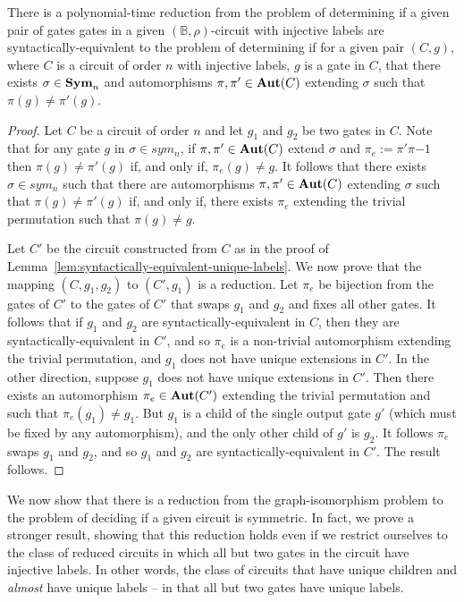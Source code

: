 \documentclass[../paper.tex]{subfiles}
\begin{document}
\begin{lem}
  There is a polynomial-time reduction from the problem of determining if a
  given pair of gates gates in a given $(\mathbb{B}, \rho)$-circuit with
  injective labels are syntactically-equivalent to the problem of determining if
  for a given pair $(C, g)$, where $C$ is a circuit of order $n$ with injective
  labels, $g$ is a gate in $C$, that there exists $\sigma \in \text{\textbf{Sym}}_n$ and
  automorphisms $\pi, \pi' \in \text{\textbf{Aut}}(C)$ extending $\sigma$ such that $\pi (g)
  \neq \pi' (g)$.
  \label{lem:syntactically-equivilent-unique-extensions}
\end{lem}
\begin{proof}
  Let $C$ be a circuit of order $n$ and let $g_1$ and $g_2$ be two gates in $C$.
  Note that for any gate $g$ in $\sigma \in sym_n$, if $\pi, \pi' \in \text{\textbf{Aut}}(C)$
  extend $\sigma$ and $\pi_e := \pi'\pi{-1}$ then $\pi(g) \neq \pi'(g)$ if, and
  only if, $\pi_e (g) \neq g$. It follows that there exists $\sigma \in sym_n$
  such that there are automorphisms $\pi, \pi' \in \text{\textbf{Aut}}(C)$ extending $\sigma$
  such that $\pi (g) \neq \pi'(g)$ if, and only if, there exists $\pi_e$
  extending the trivial permutation such that $\pi (g) \neq g$.

  Let $C'$ be the circuit constructed from $C$ as in the proof of
  Lemma~\ref{lem:syntactically-equivalent-unique-labels}. We now prove that the
  mapping $(C, g_1, g_2)$ to $(C', g_1)$ is a reduction. Let $\pi_e$ be
  bijection from the gates of $C'$ to the gates of $C'$ that swaps $g_1$ and
  $g_2$ and fixes all other gates. It follows that if $g_1$ and $g_2$ are
  syntactically-equivalent in $C$, then they are syntactically-equivalent in
  $C'$, and so $\pi_e$ is a non-trivial automorphism extending the trivial
  permutation, and $g_1$ does not have unique extensions in $C'$. In the other
  direction, suppose $g_1$ does not have unique extensions in $C'$. Then there
  exists an automorphism $\pi_e \in \text{\textbf{Aut}}(C')$ extending the trivial permutation
  and such that $\pi_e(g_1) \neq g_1$. But $g_1$ is a child of the single output
  gate $g'$ (which must be fixed by any automorphism), and the only other child
  of $g'$ is $g_2$. It follows $\pi_e$ swaps $g_1$ and $g_2$, and so $g_1$ and
  $g_2$ are syntactically-equivalent in $C'$. The result follows.
\end{proof}

We now show that there is a reduction from the graph-isomorphism problem to the
problem of deciding if a given circuit is symmetric. In fact, we prove a
stronger result, showing that this reduction holds even if we restrict ourselves
to the class of reduced circuits in which all but two gates in the circuit have
injective labels. In other words, the class of circuits that have unique
children and \emph{almost} have unique labels -- in that all but two gates have
unique labels.
\end{document}
